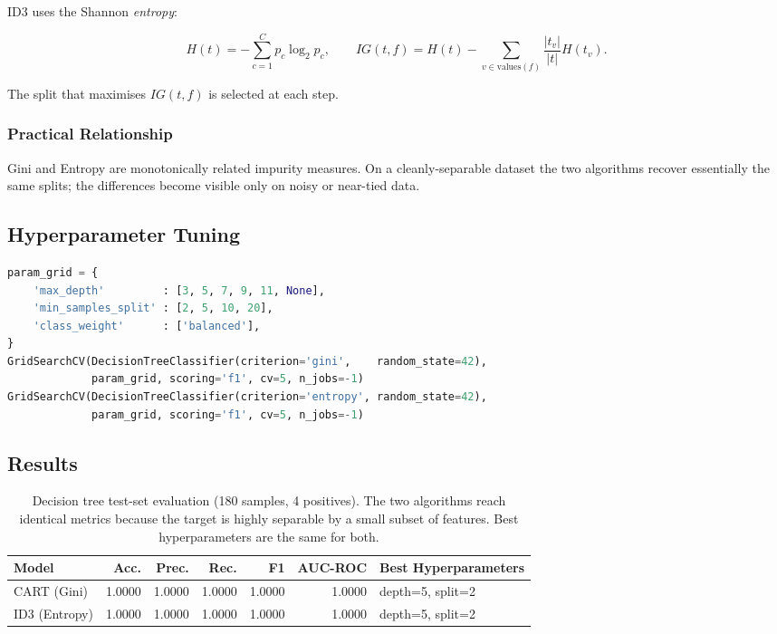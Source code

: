 \documentclass[11pt,a4paper]{article}
\begin{document}
ID3 uses the Shannon \emph{entropy}:

\begin{equation}
    H(t) = -\sum_{c=1}^{C} p_c \log_2 p_c, \qquad
    IG(t, f) = H(t) - \sum_{v \in \text{values}(f)} \frac{|t_v|}{|t|} H(t_v).
\end{equation}

The split that maximises $IG(t, f)$ is selected at each step.

\subsubsection{Practical Relationship}
Gini and Entropy are monotonically related impurity measures. On a
cleanly-separable dataset the two algorithms recover essentially the same
splits; the differences become visible only on noisy or near-tied data.

\subsection{Hyperparameter Tuning}

\begin{lstlisting}[language=Python, numbers=none, basicstyle=\ttfamily\footnotesize]
param_grid = {
    'max_depth'         : [3, 5, 7, 9, 11, None],
    'min_samples_split' : [2, 5, 10, 20],
    'class_weight'      : ['balanced'],
}
GridSearchCV(DecisionTreeClassifier(criterion='gini',    random_state=42),
             param_grid, scoring='f1', cv=5, n_jobs=-1)
GridSearchCV(DecisionTreeClassifier(criterion='entropy', random_state=42),
             param_grid, scoring='f1', cv=5, n_jobs=-1)
\end{lstlisting}

\subsection{Results}

\begin{table}[H]
    \centering
    \begin{tabular}{lrrrrrl}
        \toprule
        \textbf{Model} & \textbf{Acc.} & \textbf{Prec.} & \textbf{Rec.} & \textbf{F1} & \textbf{AUC-ROC} & \textbf{Best Hyperparameters} \\
        \midrule
        CART (Gini)  & 1.0000 & 1.0000 & 1.0000 & 1.0000 & 1.0000 & depth=5, split=2 \\
        ID3 (Entropy)& 1.0000 & 1.0000 & 1.0000 & 1.0000 & 1.0000 & depth=5, split=2 \\
        \bottomrule
    \end{tabular}
    \caption{Decision tree test-set evaluation (180 samples, 4 positives).
    The two algorithms reach identical metrics because the target is highly
    separable by a small subset of features. Best hyperparameters are the
    same for both.}
    \label{tab:dt-results}
\end{table}
\end{document}
